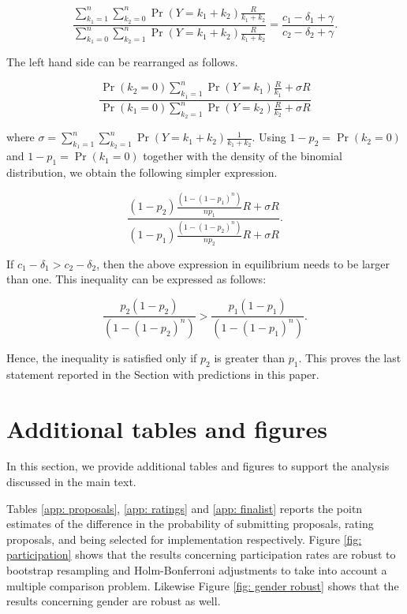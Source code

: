 \documentclass[12pt, titlepage]{article}
\begin{document}
\begin{equation}
\frac{\sum_{k_1=1}^n \sum_{k_2=0}^n \Pr(Y=k_1+k_2) \frac{R}{k_1+k_2}}{\sum_{k_1=0}^n \sum_{k_2=1}^n \Pr(Y=k_1+k_2) \frac{R}{k_1+k_2}} = \frac{c_1 -\delta_1 + \gamma}{c_2 -\delta_2 + \gamma}.
\end{equation}

The left hand side can be rearranged as follows.

\begin{equation}
\frac{\Pr(k_2=0) \sum_{k_1=1}^n\Pr(Y=k_1)\frac{R}{k_1} +  \sigma R}{\Pr(k_1=0) \sum_{k_2=1}^n\Pr(Y=k_2)\frac{R}{k_2} +  \sigma R} 
\end{equation}

where
\(\sigma = \sum_{k_1=1}^n \sum_{k_2=1}^n \Pr(Y=k_1+k_2) \frac{1}{k_1+k_2}\).
Using \(1-p_2=\Pr(k_2=0)\) and \(1-p_1=\Pr(k_1=0)\) together with the
density of the binomial distribution, we obtain the following simpler
expression.

\begin{equation}
\frac{(1-p_2) \frac{(1- (1-p_1)^n)}{n p_1} R +  \sigma R }{(1-p_1) \frac{(1- (1-p_2)^n)}{n p_2} R +  \sigma R}  .
\end{equation}

If \(c_1 - \delta_1 > c_2 - \delta_2\), then the above expression in
equilibrium needs to be larger than one. This inequality can be
expressed as follows:

\begin{equation}
\frac{p_2 (1-p_2)}{(1- (1-p_2)^n)}  > \frac{p_1 (1-p_1)}{(1- (1-p_1)^n)}.
\end{equation}

Hence, the inequality is satisfied only if \(p_2\) is greater than
\(p_1\). This proves the last statement reported in the Section with
predictions in this paper.

\section{Additional tables and
figures}\label{additional-tables-and-figures}

In this section, we provide additional tables and figures to support the
analysis discussed in the main text.

Tables \ref{app: proposals}, \ref{app: ratings} and \ref{app: finalist}
reports the poitn estimates of the difference in the probability of
submitting proposals, rating proposals, and being selected for
implementation respectively. Figure \ref{fig: participation} shows that
the results concerning participation rates are robust to bootstrap
resampling and Holm-Bonferroni adjustments to take into account a
multiple comparison problem. Likewise Figure \ref{fig: gender robust}
shows that the results concerning gender are robust as well.
\end{document}

